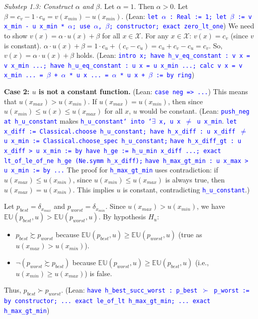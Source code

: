 \documentclass{article}
\theoremstyle{definition}
\newcommand{\X}{\mathcal{X}}
\newcommand{\EU}{\mathbb{EU}}
\newcommand{\tactic}[1]{\textcolor{blue}{\texttt{#1}}}
\newcommand{\pref}{\succsim} %
\newcommand{\strictpref}{\succ} %
\begin{document}
    \textit{Substep 1.3: Construct $\alpha$ and $\beta$.}
    Let $\alpha = 1$. Then $\alpha > 0$.
    Let $\beta = c_v - 1 \cdot c_u = v(x_{min}) - u(x_{min})$.
    (Lean: \tactic{let $\alpha$ : Real := 1; let $\beta$ := v x\_min - u x\_min * $\alpha$; use $\alpha$, $\beta$; constructor; exact zero\_lt\_one})
    We need to show $v(x) = \alpha \cdot u(x) + \beta$ for all $x \in \X$.
    For any $x \in \X$:
    $v(x) = c_v$ (since $v$ is constant).
    $\alpha \cdot u(x) + \beta = 1 \cdot c_u + (c_v - c_u) = c_u + c_v - c_u = c_v$.
    So, $v(x) = \alpha \cdot u(x) + \beta$ holds.
    (Lean: \tactic{intro x; have h\_v\_eq\_constant : v x = v x\_min ...; have h\_u\_eq\_constant : u x = u x\_min ...; calc v x = v x\_min ... = $\beta$ + $\alpha$ * u x ... = $\alpha$ * u x + $\beta$ := by ring})

\textbf{Case 2: $u$ is not a constant function.}
(Lean: \tactic{case neg => ...})
This means that $u(x_{max}) > u(x_{min})$. If $u(x_{max}) = u(x_{min})$, then since $u(x_{min}) \le u(x) \le u(x_{max})$ for all $x$, $u$ would be constant.
(Lean: \tactic{push\_neg at h\_u\_constant} makes \tactic{h\_u\_constant` into `$\exists$ x, u x $\neq$ u x\_min}.
\tactic{let x\_diff := Classical.choose h\_u\_constant; have h\_x\_diff : u x\_diff $\neq$ u x\_min := Classical.choose\_spec h\_u\_constant;}
\tactic{have h\_x\_diff\_gt : u x\_diff > u x\_min := by have h\_ge := h\_u\_min x\_diff ...; exact lt\_of\_le\_of\_ne h\_ge (Ne.symm h\_x\_diff);}
\tactic{have h\_max\_gt\_min : u x\_max > u x\_min := by ...} The proof for \tactic{h\_max\_gt\_min} uses contradiction: if $u(x_{max}) \le u(x_{min})$, since $u(x_{min}) \le u(x_{max})$ is always true, then $u(x_{max}) = u(x_{min})$. This implies $u$ is constant, contradicting \tactic{h\_u\_constant}.)

    Let $p_{best} = \delta_{x_{max}}$ and $p_{worst} = \delta_{x_{min}}$.
    Since $u(x_{max}) > u(x_{min})$, we have $\EU(p_{best}, u) > \EU(p_{worst}, u)$.
    By hypothesis $H_u$:
    \begin{itemize}
        \item $p_{best} \pref p_{worst}$ because $\EU(p_{best}, u) \ge \EU(p_{worst}, u)$ (true as $u(x_{max}) > u(x_{min})$).
        \item $\lnot(p_{worst} \pref p_{best})$ because $\EU(p_{worst}, u) \ge \EU(p_{best}, u)$ (i.e., $u(x_{min}) \ge u(x_{max})$) is false.
    \end{itemize}
    Thus, $p_{best} \strictpref p_{worst}$.
    (Lean: \tactic{have h\_best\_succ\_worst : p\_best $\succ$ p\_worst := by constructor; ... exact le\_of\_lt h\_max\_gt\_min; ... exact h\_max\_gt\_min})
\end{document}
